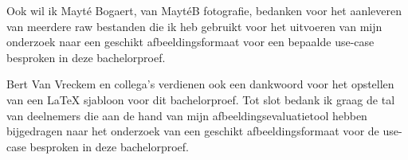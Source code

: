 Ook wil ik Mayté Bogaert, van MaytéB fotografie, bedanken voor het aanleveren van meerdere \gls{raw} bestanden die ik heb gebruikt voor het uitvoeren van mijn onderzoek naar een geschikt \gls{afbeeldingsformaat} voor een bepaalde \gls{use-case} besproken in deze bachelorproef.

Bert Van Vreckem en collega's verdienen ook een dankwoord voor het opstellen van een \LaTeX{} sjabloon voor dit bachelorproef. Tot slot bedank ik graag de tal van deelnemers die aan de hand van mijn \gls{afbeeldingsevaluatietool} hebben bijgedragen naar het onderzoek van een geschikt \gls{afbeeldingsformaat} voor de \gls{use-case} besproken in deze bachelorproef.